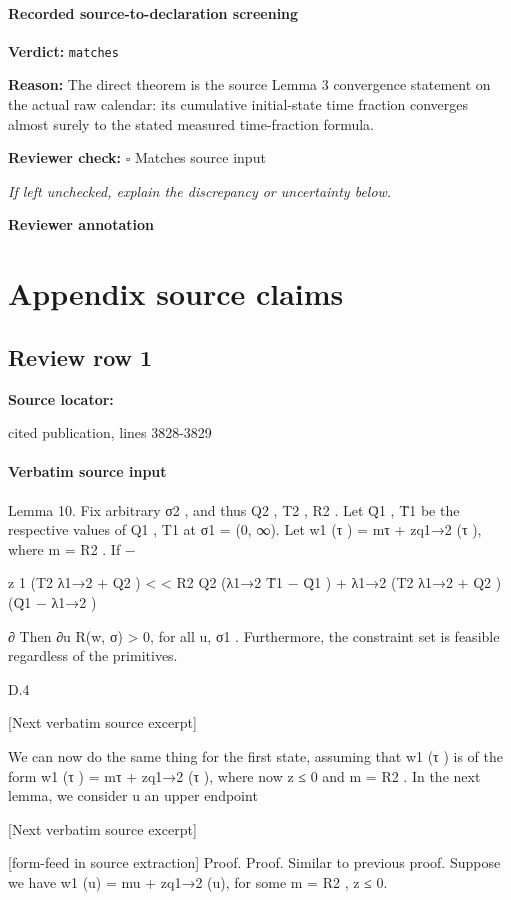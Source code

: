 \documentclass[10pt]{article}
\newcommand{\reviewerbox}{%
  \par\noindent\fbox{\parbox{0.96\linewidth}{\rule{0pt}{0.38in}}}\par
}
\newcommand{\reviewmatch}[1]{%
  \par\noindent\textbf{Reviewer check:} $\square$\; #1\par
  \noindent\emph{If left unchecked, explain the discrepancy or uncertainty below.}\par
}
\begin{document}
\paragraph{Recorded source-to-declaration screening}
\textbf{Verdict:} \texttt{matches}
\\
{\raggedright
\textbf{Reason:} The direct theorem is the source Lemma 3 convergence statement on the actual raw calendar:\allowbreak{} its cumulative initial-\allowbreak{}state time fraction converges almost surely to the stated measured time-\allowbreak{}fraction formula.\allowbreak{}
\par}
\reviewmatch{Matches source input}
\noindent\textbf{Reviewer annotation}\par
\reviewerbox

\clearpage
\hypertarget{source-claim-7650473d990d95c0}{}
\hypertarget{source-section-fc0f8ef37eccf87b}{}
\section*{Appendix source claims}
\subsection*{Review row 1}
\textbf{Source locator:} {\footnotesize\raggedright cited publication, lines 3828-\allowbreak{}3829\par}
\paragraph{Verbatim source input}
\begin{ReviewVerbatim}
Lemma 10. Fix arbitrary σ2 , and thus Q2 , T2 , R2 . Let Q̄1 , T̄1 be the respective values of Q1 , T1 at
σ1 = (0, ∞). Let w1 (τ ) = mτ + zq1→2 (τ ), where m = R2 .
If
−

z
1
(T2 λ1→2 + Q2 )
<
<
R2
Q2 (λ1→2 T̄1 − Q̄1 ) + λ1→2 (T2 λ1→2 + Q2 )
(Q̄1 − λ1→2 )

∂
Then ∂u
R(w, σ) > 0, for all u, σ1 . Furthermore, the constraint set is feasible regardless of the
primitives.

D.4

[Next verbatim source excerpt]

We can now do the same thing for the first state, assuming that w1 (τ ) is of the form w1 (τ ) =
mτ + zq1→2 (τ ), where now z ≤ 0 and m = R2 . In the next lemma, we consider u an upper endpoint

[Next verbatim source excerpt]


[form-feed in source extraction]
Proof. Proof. Similar to previous proof. Suppose we have w1 (u) = mu + zq1→2 (u), for some
m = R2 , z ≤ 0.
\end{ReviewVerbatim}
\end{document}
